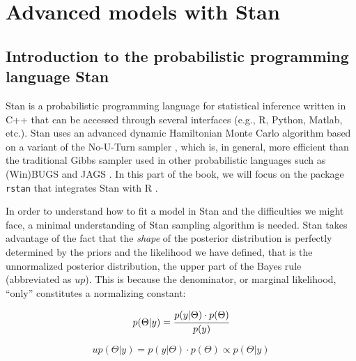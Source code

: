 \documentclass[12pt,]{krantz}
\theoremstyle{definition}
\theoremstyle{definition}
\theoremstyle{definition}
\theoremstyle{remark}
\begin{document}
\part{Advanced models with
Stan}\label{part-advanced-models-with-stan}

\chapter{Introduction to the probabilistic programming language
Stan}\label{ch:introstan}

Stan is a probabilistic programming language for statistical inference
written in C++ that can be accessed through several interfaces (e.g., R,
Python, Matlab, etc.). Stan uses an advanced dynamic Hamiltonian Monte
Carlo algorithm \citep{betancourt2016identifying} based on a variant of
the No-U-Turn sampler \citep[known as
NUTS:][]{hoffmanNoUTurnSamplerAdaptively2014}, which is, in general,
more efficient than the traditional Gibbs sampler used in other
probabilistic languages such as (Win)BUGS \citep{lunn2000winbugs} and
JAGS \citep{plummer2016jags}. In this part of the book, we will focus on
the package \texttt{rstan} \citep{R-rstan} that integrates Stan
\citep{carpenter2017stan} with R \citep{R-base}.

In order to understand how to fit a model in Stan and the difficulties
we might face, a minimal understanding of Stan sampling algorithm is
needed. Stan takes advantage of the fact that the \emph{shape} of the
posterior distribution is perfectly determined by the priors and the
likelihood we have defined, that is the unnormalized posterior
distribution, the upper part of the Bayes rule (abbreviated as \(up\)).
This is because the denominator, or marginal likelihood, ``only''
constitutes a normalizing constant:

\begin{equation}
p(\Theta|y) = \cfrac{ p(y|\Theta) \cdot p(\Theta) }{p(y)}
\label{eq:bayesagain}
\end{equation}

\begin{equation}
up(\Theta|y) = p(y|\Theta) \cdot p(\Theta) \propto p(\Theta|y)
\label{eq:bayesagain}
\end{equation}
\end{document}
